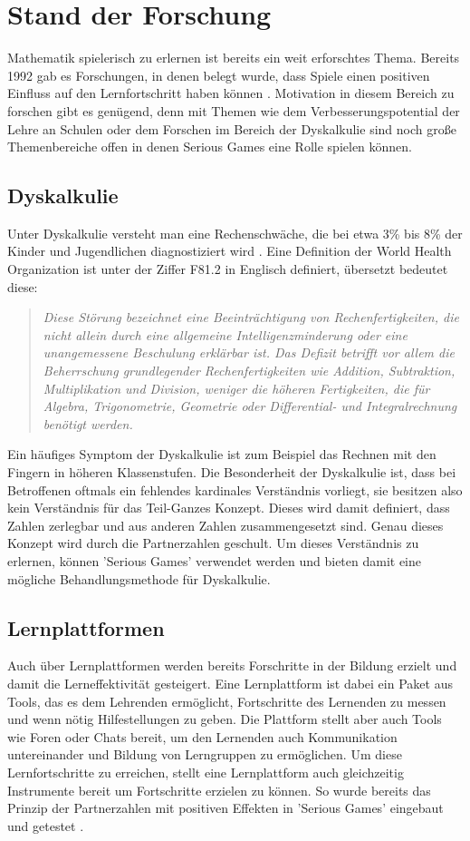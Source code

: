
\chapter{Stand der Forschung}
Mathematik spielerisch zu erlernen ist bereits ein weit erforschtes Thema. Bereits 1992 gab es Forschungen, in denen belegt wurde, dass Spiele einen positiven Einfluss auf den Lernfortschritt haben können \cite{Randel1992}. Motivation in diesem Bereich zu forschen gibt es genügend, denn mit Themen wie dem Verbesserungspotential der Lehre an Schulen \cite{moeslein2018} oder dem Forschen im Bereich der Dyskalkulie \cite{wilms2015} sind noch große Themenbereiche offen in denen Serious Games eine Rolle spielen können.
\section{Dyskalkulie}
Unter Dyskalkulie versteht man eine Rechenschwäche, die bei etwa 3\% bis 8\% der Kinder und Jugendlichen diagnostiziert wird \cite{Dyskalkulie2018}. Eine Definition der World Health Organization\cite{who} ist unter der Ziffer F81.2 in Englisch definiert, übersetzt bedeutet diese:
\begin{quote}
\textit{ Diese Störung bezeichnet eine Beeinträchtigung von Rechenfertigkeiten, die nicht allein durch eine allgemeine Intelligenzminderung oder eine unangemessene Beschulung erklärbar ist. Das Defizit betrifft vor allem die Beherrschung grundlegender Rechenfertigkeiten wie Addition, Subtraktion, Multiplikation und Division, weniger die höheren Fertigkeiten, die für Algebra, Trigonometrie, Geometrie oder Differential- und Integralrechnung benötigt werden. }
\end{quote}
Ein häufiges Symptom der Dyskalkulie ist zum Beispiel das Rechnen mit den Fingern in höheren Klassenstufen. Die Besonderheit der Dyskalkulie ist, dass bei Betroffenen oftmals ein fehlendes kardinales Verständnis vorliegt\cite{fritz2009}, sie besitzen also kein Verständnis für das Teil-Ganzes Konzept. Dieses wird damit definiert, dass Zahlen zerlegbar und aus anderen Zahlen zusammengesetzt sind. Genau dieses Konzept wird durch die Partnerzahlen geschult. Um dieses Verständnis zu erlernen, können 'Serious Games' verwendet werden\cite{Sch2016} und bieten damit eine mögliche Behandlungsmethode für Dyskalkulie.
\section{Lernplattformen}
Auch über Lernplattformen werden bereits Forschritte in der Bildung erzielt und damit die Lerneffektivität gesteigert. Eine Lernplattform ist dabei ein Paket aus Tools, das es dem Lehrenden ermöglicht, Fortschritte des Lernenden zu messen und wenn nötig Hilfestellungen zu geben. Die Plattform stellt aber auch Tools wie Foren oder Chats bereit, um den Lernenden auch Kommunikation untereinander und Bildung von Lerngruppen zu ermöglichen. Um diese Lernfortschritte zu erreichen, stellt eine Lernplattform auch gleichzeitig Instrumente bereit um Fortschritte erzielen zu können. So wurde bereits das Prinzip der Partnerzahlen mit positiven Effekten in 'Serious Games' eingebaut und getestet \cite{JUNG2015}.
